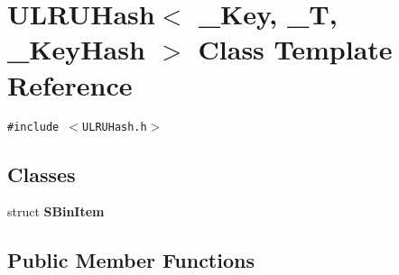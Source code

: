 \hypertarget{class_u_l_r_u_hash}{
\section{ULRUHash$<$ \_\-Key, \_\-T, \_\-KeyHash $>$ Class Template Reference}
\label{class_u_l_r_u_hash}
}
{\tt \#include $<$ULRUHash.h$>$}

\subsection*{Classes}
\begin{CompactItemize}
\item 
struct \textbf{SBinItem}
\end{CompactItemize}
\subsection*{Public Member Functions}
